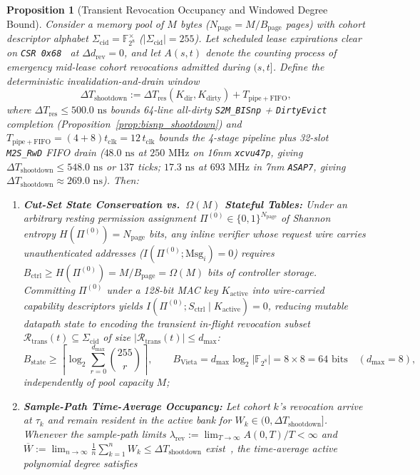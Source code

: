 \documentclass[11pt,letterpaper]{article}
\theoremstyle{spectralthm}
\newtheorem{proposition}[theorem]{Proposition}
\begin{document}
\begin{proposition}[Transient Revocation Occupancy and Windowed Degree Bound]
\label{prop:little_vieta}
Consider a memory pool of $M$ bytes ($N_{\mathrm{page}} = M / B_{\mathrm{page}}$ pages) with cohort descriptor alphabet $\Sigma_{\mathrm{cid}} = \mathbb{F}_{2^8}^\times$ ($|\Sigma_{\mathrm{cid}}| = 255$). Let scheduled lease expirations clear on \texttt{CSR 0x68}~\cite{varghese1997timing} at $\Delta d_{\mathrm{rev}} = 0$, and let $A(s, t)$ denote the counting process of emergency mid-lease cohort revocations admitted during $(s, t]$. Define the deterministic invalidation-and-drain window
\[
\Delta T_{\mathrm{shootdown}} := \Delta T_{\mathrm{res}}(K_{\mathrm{dir}}, K_{\mathrm{dirty}}) + T_{\mathrm{pipe+FIFO}},
\]
where $\Delta T_{\mathrm{res}} \le 500.0\text{~ns}$ bounds 64-line all-dirty \texttt{S2M\_BISnp} + \texttt{DirtyEvict} completion (Proposition~\ref{prop:bisnp_shootdown}) and $T_{\mathrm{pipe+FIFO}} = (4 + 8)t_{\mathrm{clk}} = 12\,t_{\mathrm{clk}}$ bounds the 4-stage pipeline plus 32-slot \texttt{M2S\_RwD} FIFO drain ($48.0\text{~ns}$ at $250\text{~MHz}$ on 16nm \texttt{xcvu47p}, giving $\Delta T_{\mathrm{shootdown}} \le 548.0\text{~ns}$ or $137$ ticks; $17.3\text{~ns}$ at $693\text{~MHz}$ in 7nm \texttt{ASAP7}, giving $\Delta T_{\mathrm{shootdown}} \approx 269.0\text{~ns}$). Then:
\begin{enumerate}
  \item[(i)] \textbf{Cut-Set State Conservation vs.\ $\Omega(M)$ Stateful Tables:} Under an arbitrary resting permission assignment $\Pi^{(0)} \in \{0,1\}^{N_{\mathrm{page}}}$ of Shannon entropy $H(\Pi^{(0)}) = N_{\mathrm{page}}$ bits, any inline verifier whose request wire carries unauthenticated addresses ($I(\Pi^{(0)}; \mathrm{Msg}_i) = 0$) requires $B_{\mathrm{ctrl}} \ge H(\Pi^{(0)}) = M / B_{\mathrm{page}} = \Omega(M)$ bits of controller storage. Committing $\Pi^{(0)}$ under a 128-bit MAC key $K_{\mathrm{active}}$ into wire-carried capability descriptors yields $I(\Pi^{(0)}; S_{\mathrm{ctrl}} \mid K_{\mathrm{active}}) = 0$, reducing mutable datapath state to encoding the transient in-flight revocation subset $\mathcal{R}_{\mathrm{trans}}(t) \subseteq \Sigma_{\mathrm{cid}}$ of size $|\mathcal{R}_{\mathrm{trans}}(t)| \le d_{\max}$:
  \[
  B_{\mathrm{state}} \ge \left\lceil \log_2 \sum_{r=0}^{d_{\max}} \binom{255}{r} \right\rceil, \qquad
  B_{\mathrm{Vieta}} = d_{\max}\log_2\bigl|\mathbb{F}_{2^8}\bigr| = 8 \times 8 = 64\text{~bits}\quad(d_{\max} = 8),
  \]
  \noindent independently of pool capacity $M$;
  \item[(ii)] \textbf{Sample-Path Time-Average Occupancy:} Let cohort $k$'s revocation arrive at $\tau_k$ and remain resident in the active bank for $W_k \in (0, \Delta T_{\mathrm{shootdown}}]$. Whenever the sample-path limits $\lambda_{\mathrm{rev}} := \lim_{T\to\infty} A(0,T)/T < \infty$ and $\overline{W} := \lim_{n\to\infty}\frac{1}{n}\sum_{k=1}^n W_k \le \Delta T_{\mathrm{shootdown}}$ exist~\cite{little1961proof, stidham1974sample}, the time-average active polynomial degree satisfies

\end{enumerate}
\end{proposition}
\end{document}
